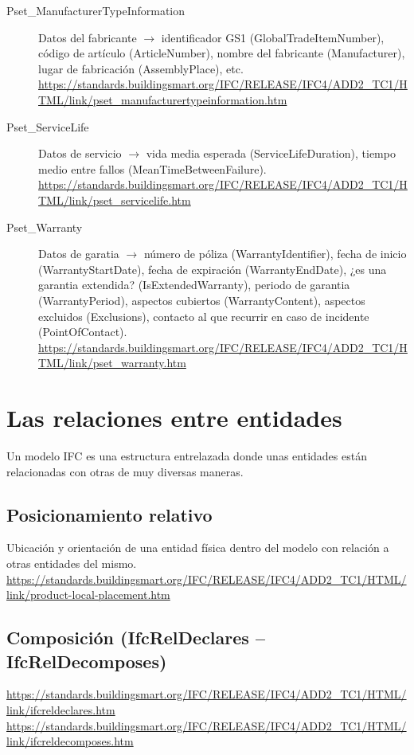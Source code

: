 \documentclass[spanish,12pt,a4paper,final,oneside]{book}
\begin{document}
\begin{description}
\item[Pset\_ManufacturerTypeInformation] Datos del fabricante  $\rightarrow$ identificador GS1 (GlobalTradeItemNumber), código de artículo (ArticleNumber), nombre del fabricante (Manufacturer), lugar de fabricación (AssemblyPlace), etc.
\\ \url{https://standards.buildingsmart.org/IFC/RELEASE/IFC4/ADD2_TC1/HTML/link/pset_manufacturertypeinformation.htm}

\item[Pset\_ServiceLife] Datos de servicio $\rightarrow$ vida media esperada (ServiceLifeDuration), tiempo medio entre fallos (MeanTimeBetweenFailure).
\\ \url{https://standards.buildingsmart.org/IFC/RELEASE/IFC4/ADD2_TC1/HTML/link/pset_servicelife.htm}

\item[Pset\_Warranty] Datos de garatia $\rightarrow$ número de póliza (WarrantyIdentifier), fecha de inicio (WarrantyStartDate), fecha de expiración (WarrantyEndDate), ¿es una garantia extendida? (IsExtendedWarranty), periodo de garantia (WarrantyPeriod),  aspectos cubiertos  (WarrantyContent), aspectos excluidos (Exclusions), contacto al que recurrir en caso de incidente (PointOfContact).
\\ \url{https://standards.buildingsmart.org/IFC/RELEASE/IFC4/ADD2_TC1/HTML/link/pset_warranty.htm}

\end{description}



\section{Las \textbf{relaciones} entre entidades}
Un modelo IFC es una estructura entrelazada donde unas entidades están relacionadas con otras de muy diversas maneras.

\subsection{Posicionamiento relativo}
Ubicación y orientación de una entidad física dentro del modelo con relación a otras entidades del mismo.
\\ \url{https://standards.buildingsmart.org/IFC/RELEASE/IFC4/ADD2_TC1/HTML/link/product-local-placement.htm}


\subsection{Composición (IfcRelDeclares -- IfcRelDecomposes)}
\url{https://standards.buildingsmart.org/IFC/RELEASE/IFC4/ADD2_TC1/HTML/link/ifcreldeclares.htm}
\\ \url{https://standards.buildingsmart.org/IFC/RELEASE/IFC4/ADD2_TC1/HTML/link/ifcreldecomposes.htm}
\end{document}
